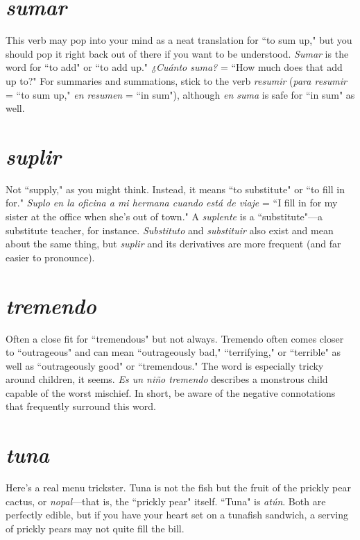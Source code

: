 \section{\emph{sumar}}

This verb may pop into your mind as a neat translation for ``to sum up," but you should pop it right back out of there if
you want to be understood. \emph{Sumar} is the word for ``to add" or ``to add
up." \emph{¿Cuánto suma?} = ``How much does that add up to?" For summaries and summations, stick to the verb \emph{resumir} (\emph{para resumir} = ``to
sum up," \emph{en resumen} = ``in sum"), although \emph{en suma} is safe for ``in sum" as well.

\section{\emph{suplir}}

Not ``supply," as you might think. Instead, it means
``to substitute" or ``to fill in for." \emph{Suplo en la oficina a mi hermana
	cuando está de viaje} = ``I fill in for my sister at the office when she's
out of town." A \emph{suplente} is a ``substitute"---a substitute teacher, for
instance. \emph{Substituto} and \emph{substituir} also exist and mean about the
same thing, but \emph{suplir} and its derivatives are more frequent (and far
easier to pronounce).

\section{\emph{tremendo}}

Often a close fit for ``tremendous" but not always. Tremendo often comes closer to ``outrageous" and can mean
``outrageously bad," ``terrifying," or ``terrible" as well as ``outrageously
good" or ``tremendous." The word is especially tricky around children,
it seems. \emph{Es un niño tremendo} describes a monstrous child capable of
the worst mischief. In short, be aware of the negative connotations
that frequently surround this word.

\section{\emph{tuna}}

Here's a real menu trickster. Tuna is not the fish but
the fruit of the prickly pear cactus, or \emph{nopal}---that is, the ``prickly
pear" itself. ``Tuna" is \emph{atún}. Both are perfectly edible, but if you have
your heart set on a tunafish sandwich, a serving of prickly pears may
not quite fill the bill.

